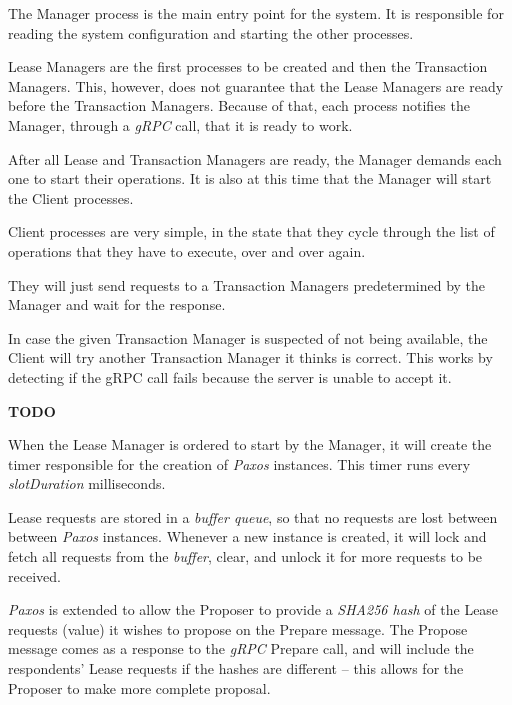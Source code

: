 \documentclass[times, 10pt,twocolumn]{article}
\begin{document}
The Manager process is the main entry point for the system. It is responsible for reading
the system configuration and starting the other processes.

Lease Managers are the first processes to be created and then the Transaction Managers.
This, however, does not guarantee that the Lease Managers are ready before the Transaction Managers.
Because of that, each process notifies the Manager, through a \textit{gRPC} call, that it is ready to work.

After all Lease and Transaction Managers are ready, the Manager demands each one to start
their operations. It is also at this time that the Manager will start the Client processes.


Client processes are very simple, in the state that they cycle through the list of operations
that they have to execute, over and over again.

They will just send requests to a Transaction Managers predetermined by the Manager
and wait for the response.

In case the given Transaction Manager is suspected of not being available,
the Client will try another Transaction Manager it thinks is correct.
This works by detecting if the gRPC call fails because the server is unable to accept it.


\textbf{TODO}

When the Lease Manager is ordered to start by the Manager, it will create the
timer responsible for the creation of \textit{Paxos} instances.
This timer runs every \textit{slotDuration} milliseconds.

Lease requests are stored in a \textit{buffer queue}, so that no requests are lost between
between \textit{Paxos} instances. Whenever a new instance is created, it will lock
and fetch all requests from the \textit{buffer}, clear, and unlock it for more
requests to be received.

\textit{Paxos} is extended to allow the Proposer to provide a \textit{SHA256 hash} of
the Lease requests (value) it wishes to propose on the Prepare message. The Propose
message comes as a response to the \textit{gRPC} Prepare call, and will include the
respondents' Lease requests if the hashes are different -- this allows for the Proposer
to make more complete proposal.
\end{document}

